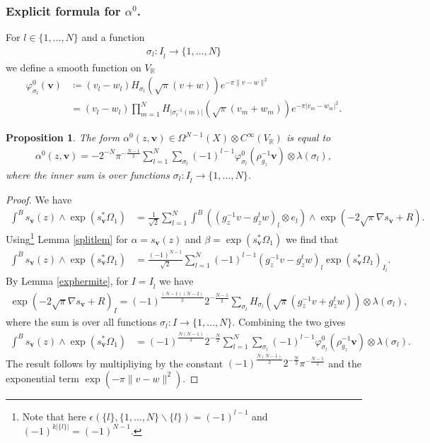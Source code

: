 \documentclass[a4paper,11pt]{amsart} %
\newcommand{\8}{\infty}
\newcommand{\vbf}{\mathbf{v}}
\newcommand{\R}{\mathbb{R}}
\theoremstyle{mytheoremstyle}
\newtheorem{prop}[thm]{Proposition}
\theoremstyle{remark}
\numberwithin{equation}{section}
\begin{document}
\subsubsection{Explicit formula for $\alpha^0$.}  For $l \in \{1, \dots,N\}$ and a function 
\begin{align}
\sigma_l \colon I_{\widehat{l}} \longrightarrow  \{1, \dots,N\}
\end{align} 
we define a smooth function on $V_\R$
\begin{align}
\varphi^0_{\sigma_l}(\vbf) & \coloneqq (v_l-w_l) H_{\sigma_l}(\sqrt{\pi}(v+w)) e^{-\pi  \lVert v-w \rVert^2 } \nonumber \\
& = (v_l-w_l)\prod_{m=1}^N H_{\vert \sigma_l^{-1}(m) \vert}\left (\sqrt{\pi}(v_m+w_m) \right ) e^{-\pi  \lvert v_m- w_m \rvert^2}.
\end{align}
\begin{prop} \label{explicitalphatil}
    The form $\alpha^0(z,\vbf)\in \Omega^{N-1}(X) \otimes C^\8(V_\R)$ is equal to
    \begin{align}
    \alpha^0(z,\vbf)=-2^{-N}\pi^{-\frac{N-1}{2}} \sum_{l=1}^N \sum_{\sigma_l}(-1)^{l-1} \varphi^0_{\sigma_l}(\rho_{g_z}^{-1}\vbf) \otimes \lambda(\sigma_l),
\end{align}
where the inner sum is over functions $\sigma_l \colon I_{\widehat{l}} \longrightarrow  \{1, \dots,N\}$.
\end{prop}
\begin{proof} We have
\begin{align}
  \int^B s_\vbf(z) \wedge \exp(s_\vbf^\ast \Omega_1) & = \frac{1}{\sqrt{2}} \sum_{l=1}^N  \int^B  ((g_z^{-1}v-g_z^tw)_l \otimes e_l) \wedge \exp \left (-2\sqrt{\pi} \nabla s_\vbf+R \right ).
\end{align}
Using\footnote{Note that here $\epsilon(\{l\},\{1,\dots,N\}\smallsetminus\{l\})=(-1)^{l-1}$ and $(-1)^{k \vert \{l\} \vert } =(-1)^{N-1}$.}  Lemma \ref{splitlem} for $\alpha=s_\vbf(z)$ and $\beta=\exp(s_\vbf^\ast \Omega_1)$ we find that
\begin{align}
\int^B s_\vbf(z) \wedge \exp(s_\vbf^\ast \Omega_1) & = \frac{(-1)^{N-1}}{\sqrt{2}}\sum_{l=1}^N (-1)^{l-1} (g_z^{-1}v-g_z^tw)_l \exp(s_\vbf^\ast \Omega_1)_{I_{\widehat{l}}}.
\end{align}
By Lemma \ref{exphermite}, for $I =I_{\widehat{l}}$ we have
\begin{align}
\exp \left (-2\sqrt{\pi} \nabla s_\vbf+R \right )_I=(-1)^{\frac{(N-1) (N-2)}{2}}2^{-\frac{N-1}{2}}\sum_{\sigma_l}  H_{\sigma_l}\left (\sqrt{\pi}(g_z^{-1}v+g_z^{t}w) \right ) \otimes \lambda(\sigma_l),
\end{align}
where the sum is over all functions $\sigma_l \colon I \longrightarrow \{1, \dots, N\}$. Combining the two gives
\begin{align}
\int^B s_\vbf(z) \wedge \exp(s_\vbf^\ast \Omega_1) & = (-1)^{\frac{N(N-1)}{2}}2^{-\frac{N}{2}}\sum_{l=1}^N \sum_{\sigma_l}  (-1)^{l-1} \varphi^0_{\sigma_l}(\rho_{g_z}^{-1}\vbf) \otimes \lambda(\sigma_l).
\end{align}
The result follows by multipliying by the constant $(-1)^{\frac{N(N-1)}{2}}2^{-\frac{N}{2}}\pi^{-\frac{N-1}{2}}$ and the exponential term $\exp\left (-\pi  \lVert v-w \rVert^2 \right )$.
\end{proof}
\end{document}
